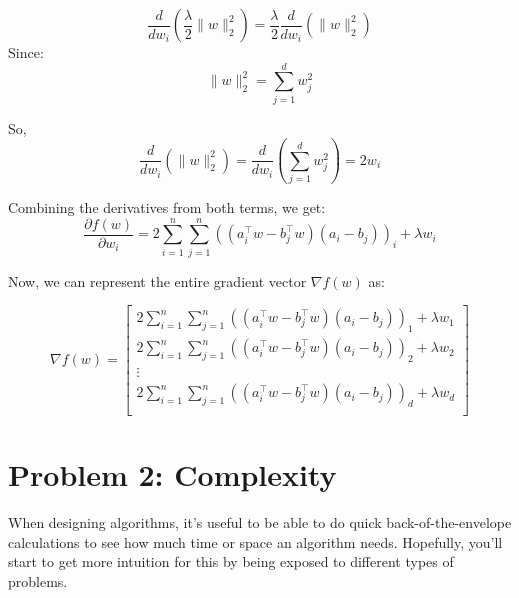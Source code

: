 \documentclass{article}
\theoremstyle{case}
\theoremstyle{definition}
\begin{document}
\begin{enumerate}[label=\alph*.]
{   \[ \frac{d}{dw_i}\left(\frac{\lambda}{2} \|w\|_2^2\right) = \frac{\lambda}{2} \frac{d}{dw_i}(\|w\|_2^2) \]
Since:
   \[ \|w\|_2^2 = \sum_{j=1}^{d} w_j^2 \]

   So,
   \[ \frac{d}{dw_i}(\|w\|_2^2) = \frac{d}{dw_i}\left(\sum_{j=1}^{d} w_j^2\right) = 2w_i \]


Combining the derivatives from both terms, we get:
\[
\frac{\partial f(w)}{\partial w_i} = 2 \sum_{i=1}^{n} \sum_{j=1}^{n} \left( (a_i^\top w - b_j^\top w)(a_i - b_j) \right)_i + \lambda w_i
\]

Now, we can represent the entire gradient vector \(\nabla f(w)\) as:

\[

\nabla f(w) = \begin{bmatrix}
2 \sum_{i=1}^{n} \sum_{j=1}^{n} \left( (a_i^\top w - b_j^\top w)(a_i - b_j) \right)_1 + \lambda w_1 \\
2 \sum_{i=1}^{n} \sum_{j=1}^{n} \left( (a_i^\top w - b_j^\top w)(a_i - b_j) \right)_2 + \lambda w_2 \\
\vdots \\
2 \sum_{i=1}^{n} \sum_{j=1}^{n} \left( (a_i^\top w - b_j^\top w)(a_i - b_j) \right)_d + \lambda w_d \\
\end{bmatrix}
\]
    }

\end{enumerate}

\section*{Problem 2: Complexity}
When designing algorithms, it's useful to be able to do quick back-of-the-envelope
calculations to see how much time or space an algorithm needs.
Hopefully, you'll start to get more intuition for this by being exposed
to different types of problems.
\end{document}
